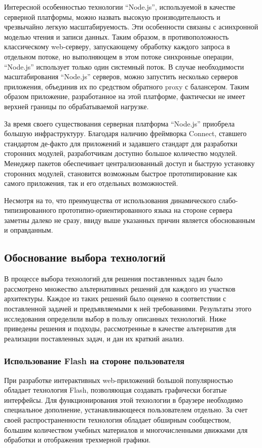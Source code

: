 Интересной особенностью технологии ``Node.js'', используемой в качестве серверной
платформы, можно назвать высокую производительность и чрезвычайно легкую
масштабируемость. Эти особенности связаны с асинхронной моделью чтения и записи
данных. Таким образом, в противоположность классическому web-серверу,
запускающему обработку каждого запроса в отдельном потоке, но выполняющем в этом
потоке синхронные операции, ``Node.js'' использует только один системный поток.
В случае необходимости масштабирования ``Node.js'' серверов, можно запустить
несколько серверов приложения, объединив их по средством обратного proxy с
балансером. Таким образом приложение, разработанное на этой платформе,
фактически не имеет верхней границы по обрабатываемой нагрузке.

За время своего существования серверная платформа ``Node.js'' приобрела большую
инфраструктуру. Благодаря наличию фреймворка Connect, ставшего стандартом
де-факто для приложений и задавшего стандарт для разработки сторонних модулей,
разработчикам доступно большое количество модулей. Менеджер пакетов обеспечивает
централизованный доступ и быструю установку сторонних модулей, становится
возможным быстрое прототипирование как самого приложения, так и его отдельных
возможностей.

Несмотря на то, что преимущества от использования динамического
слабо-типизированного прототипно-ориентированного языка на стороне сервера
заметны далеко не сразу, ввиду выше указанных причин является
обоснованным и оправданным.

\subsection{Обоснование выбора технологий}

В процессе выбора технологий для решения поставленных задач было
рассмотрено множество альтернативных решений для каждого из участков
архитектуры. Каждое из таких решений было оценено в соответствии с
поставленной задачей и предъявляемыми к ней требованиями. Результаты
этого исследования определили выбор в пользу описанных технологий. Ниже
приведены решения и подходы, рассмотренные в качестве альтернатив для
реализации поставленных задач, и дан их краткий анализ.

\subsubsection{Использование Flash на стороне пользователя}

При разработке интерактивных web-приложений большой популярностью обладает
технология Flash, позволяющая создавать графически богатые интерфейсы. Для
функционирования этой технологии в браузере необходимо специальное дополнение,
устанавливающееся пользователем отдельно. За счет
своей распространенности технология обладает обширным сообществом, большим
количеством учебных материалов и многочисленными движками для обработки и
отображения трехмерной графики.

